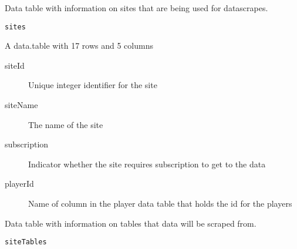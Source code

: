 \documentclass[a4paper]{book}
\begin{document}
%
\begin{Description}\relax
Data table with information on sites that are being used for datascrapes.
\end{Description}
%
\begin{Usage}
\begin{verbatim}
sites
\end{verbatim}
\end{Usage}
%
\begin{Format}
A data.table with 17 rows and 5 columns
\begin{description}

\item[siteId] Unique integer identifier for the site
\item[siteName] The name of the site
\item[subscription] Indicator whether the site requires subscription to get
to the data
\item[playerId] Name of column in the player data table that holds the id
for the players

\end{description}
\end{Format}
%
\begin{Description}\relax
Data table with information on tables that data will be scraped from.
\end{Description}
%
\begin{Usage}
\begin{verbatim}
siteTables
\end{verbatim}
\end{Usage}
%
\end{document}
